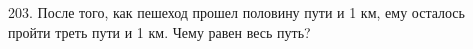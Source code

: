 203. После того, как пешеход прошел половину пути и 1 км, ему осталось пройти треть пути и 1 км. Чему равен весь путь?\\

